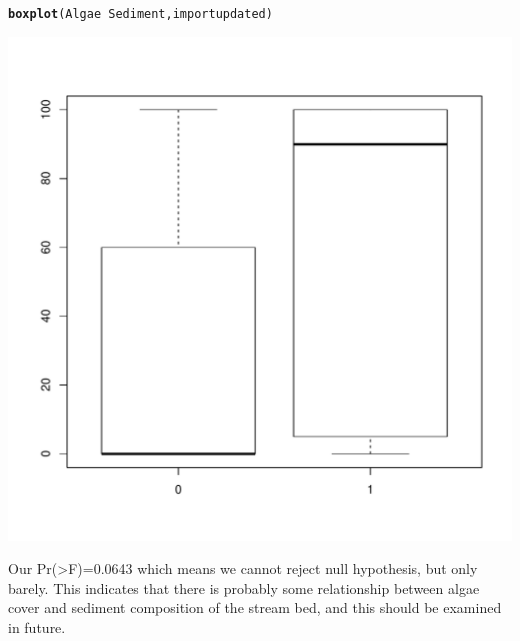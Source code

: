 \documentclass{article}\usepackage[]{graphicx}\usepackage[]{color}
\makeatletter
\def\maxwidth{ %
  \ifdim\Gin@nat@width>\linewidth
    \linewidth
  \else
    \Gin@nat@width
  \fi
}
\newcommand{\hlopt}[1]{\textcolor[rgb]{0,0,0}{#1}}%
\newcommand{\hlstd}[1]{\textcolor[rgb]{0.345,0.345,0.345}{#1}}%
\newcommand{\hlkwd}[1]{\textcolor[rgb]{0.737,0.353,0.396}{\textbf{#1}}}%
\newenvironment{kframe}{%
 \def\at@end@of@kframe{}%
 \ifinner\ifhmode%
  \def\at@end@of@kframe{\end{minipage}}%
  \begin{minipage}{\columnwidth}%
 \fi\fi%
 \def\FrameCommand##1{\hskip\@totalleftmargin \hskip-\fboxsep
 \colorbox{shadecolor}{##1}\hskip-\fboxsep
     \hskip-\linewidth \hskip-\@totalleftmargin \hskip\columnwidth}%
 \MakeFramed {\advance\hsize-\width
   \@totalleftmargin\z@ \linewidth\hsize
   \@setminipage}}%
 {\par\unskip\endMakeFramed%
 \at@end@of@kframe}
\newenvironment{knitrout}{}{} %
\makeatother
\begin{document}
\begin{knitrout}
\color{fgcolor}\begin{kframe}
\begin{alltt}
\hlkwd{boxplot}\hlstd{(Algae}\hlopt{~}\hlstd{Sediment,importupdated)}
\end{alltt}
\end{kframe}
\includegraphics[width=\maxwidth]{figure/unnamed-chunk-13-1} 

\end{knitrout}
Our Pr(>F)=0.0643 which means we cannot reject null hypothesis, but only barely. This indicates that there is probably some relationship between algae cover and sediment composition of the stream bed, and this should be examined in future.
\end{document}
